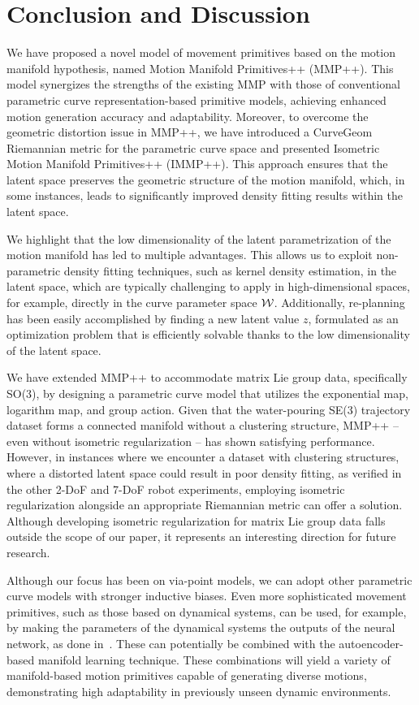 \section{Conclusion and Discussion}
We have proposed a novel model of movement primitives based on the motion manifold hypothesis, named Motion Manifold Primitives++ (MMP++). This model synergizes the strengths of the existing MMP with those of conventional parametric curve representation-based primitive models, achieving enhanced motion generation accuracy and adaptability. Moreover, to overcome the geometric distortion issue in MMP++, we have introduced a CurveGeom Riemannian metric for the parametric curve space and presented Isometric Motion Manifold Primitives++ (IMMP++). This approach ensures that the latent space preserves the geometric structure of the motion manifold, which, in some instances, leads to significantly improved density fitting results within the latent space.

We highlight that the low dimensionality of the latent parametrization of the motion manifold has led to multiple advantages. This allows us to exploit non-parametric density fitting techniques, such as kernel density estimation, in the latent space, which are typically challenging to apply in high-dimensional spaces, for example, directly in the curve parameter space ${\cal W}$. Additionally, re-planning has been easily accomplished by finding a new latent value $z$, formulated as an optimization problem that is efficiently solvable thanks to the low dimensionality of the latent space.

We have extended MMP++ to accommodate matrix Lie group data, specifically SO(3), by designing a parametric curve model that utilizes the exponential map, logarithm map, and group action. Given that the water-pouring SE(3) trajectory dataset forms a connected manifold without a clustering structure, MMP++ -- even without isometric regularization -- has shown satisfying performance. However, in instances where we encounter a dataset with clustering structures, where a distorted latent space could result in poor density fitting, as verified in the other 2-DoF and 7-DoF robot experiments, employing isometric regularization alongside an appropriate Riemannian metric can offer a solution. Although developing isometric regularization for matrix Lie group data falls outside the scope of our paper, it represents an interesting direction for future research.

Although our focus has been on via-point models, we can adopt other parametric curve models with stronger inductive biases. Even more sophisticated movement primitives, such as those based on dynamical systems, can be used, for example, by making the parameters of the dynamical systems the outputs of the neural network, as done in~\cite{bahl2020neural}. These can potentially be combined with the autoencoder-based manifold learning technique. These combinations will yield a variety of manifold-based motion primitives capable of generating diverse motions, demonstrating high adaptability in previously unseen dynamic environments.

